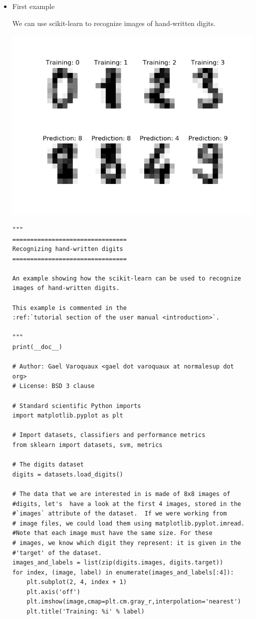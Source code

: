 \graphicspath{ {fig/} }
\begin{itemize}
\item{First example}

\tab We can use scikit-learn to recognize images of hand-written digits.

\begin{center}
  	\includegraphics[scale=0.8]{exemplu1}
\end{center}

\begin{lstlisting}[frame=single]
"""
================================
Recognizing hand-written digits
================================

An example showing how the scikit-learn can be used to recognize 
images of hand-written digits.

This example is commented in the
:ref:`tutorial section of the user manual <introduction>`.

"""
print(__doc__)

# Author: Gael Varoquaux <gael dot varoquaux at normalesup dot 
org>
# License: BSD 3 clause

# Standard scientific Python imports
import matplotlib.pyplot as plt

# Import datasets, classifiers and performance metrics
from sklearn import datasets, svm, metrics

# The digits dataset
digits = datasets.load_digits()

# The data that we are interested in is made of 8x8 images of 
#digits, let's  have a look at the first 4 images, stored in the 
#`images` attribute of the dataset.  If we were working from
# image files, we could load them using matplotlib.pyplot.imread.  
#Note that each image must have the same size. For these
# images, we know which digit they represent: it is given in the 
#'target' of the dataset.
images_and_labels = list(zip(digits.images, digits.target))
for index, (image, label) in enumerate(images_and_labels[:4]):
    plt.subplot(2, 4, index + 1)
    plt.axis('off')
    plt.imshow(image,cmap=plt.cm.gray_r,interpolation='nearest')
    plt.title('Training: %i' % label)


\end{lstlisting}
\end{itemize}
